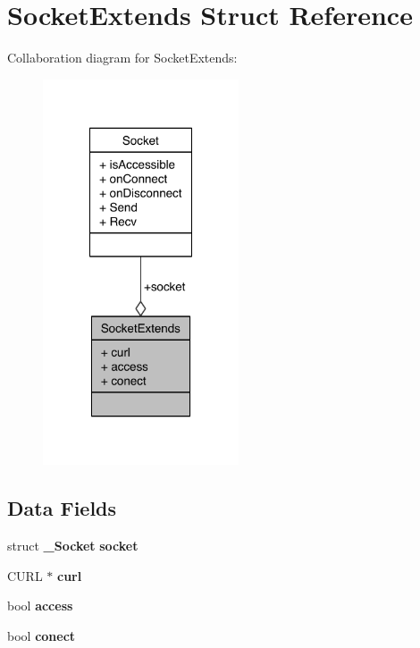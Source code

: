 \section{Socket\-Extends Struct Reference}
\label{structSocketExtends}


Collaboration diagram for Socket\-Extends\-:\nopagebreak
\begin{figure}[H]
\begin{center}
\leavevmode
\includegraphics[width=164pt]{structSocketExtends__coll__graph}
\end{center}
\end{figure}
\subsection*{Data Fields}
\begin{DoxyCompactItemize}
\item 
struct {\bf \-\_\-\-Socket} {\bfseries socket}\label{structSocketExtends_a72db96b2d28f1217b357073131a5b8a1}

\item 
C\-U\-R\-L $\ast$ {\bfseries curl}\label{structSocketExtends_ac4e09c356224fd201e7ef74a97834433}

\item 
bool {\bfseries access}\label{structSocketExtends_abbd73c1e9c1d309ae932bef7c8ca0023}

\item 
bool {\bfseries conect}\label{structSocketExtends_a7d952204fb2c469e6afd7cb2ea18ddf0}

\end{DoxyCompactItemize}


